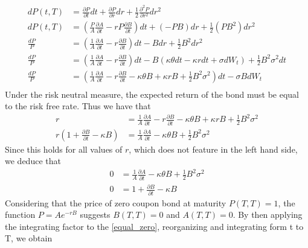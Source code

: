 \begin{align*}
    dP(t,T) &= \frac{\partial P}{\partial t} dt + \frac{\partial P}{\partial r} dr 
    + \frac{1}{2} \frac{\partial^2 P}{\partial r^2} dr^2 \\
    dP(t,T) &= \left( \frac{P}{A} \frac{\partial A}{\partial t} - rP \frac{\partial B}{\partial t} \right) dt 
    + (-PB) dr + \frac{1}{2} (PB^2) dr^2 \\
    \frac{dP}{P} &= \left( \frac{1}{A} \frac{\partial A}{\partial t} - r \frac{\partial B}{\partial t} \right) dt 
    - B dr + \frac{1}{2} B^2 dr^2 \\
    \frac{dP}{P} &= \left( \frac{1}{A} \frac{\partial A}{\partial t} - r \frac{\partial B}{\partial t} \right) dt
     - B(\kappa \theta dt - \kappa r dt + \sigma dW_t) + \frac{1}{2} B^2 \sigma^2 dt\\
    \frac{dP}{P} &= \left( \frac{1}{A} \frac{\partial A}{\partial t} - r \frac{\partial B}{\partial t} 
    - \kappa \theta B + \kappa r B + \frac{1}{2} B^2 \sigma^2 \right) dt - \sigma B dW_t \\
\end{align*}
Under the risk neutral measure, the expected return of the bond must be equal to the risk free rate. Thus we have that
\begin{align*}
    r  &= \frac{1}{A} \frac{\partial A}{\partial t} - r \frac{\partial B}{\partial t} - \kappa \theta B 
    + \kappa r B + \frac{1}{2} B^2 \sigma^2  \\
    r \left( 1 + \frac{\partial B}{\partial t} - \kappa B \right) & =\frac{1}{A} \frac{\partial A}{\partial t} 
    - \kappa \theta B + \frac{1}{2} B^2 \sigma^2 
\end{align*}
Since this holds for all values of $r$, which does not feature in the left hand side, we deduce that
\begin{align}
    0 &= \frac{1}{A} \frac{\partial A}{\partial t} - \kappa \theta B + \frac{1}{2} B^2 \sigma^2 \label{equal_zero2}\\
    0 &=1 + \frac{\partial B}{\partial t} - \kappa B \label{equal_zero}
\end{align}
Considering that the price of zero coupon bond at maturity $P(T,T)=1$, the function $P=A e^{-rB}$ suggests $B(T,T)=0$
and $A(T,T)=0$. By then applying the integrating factor to the \autoref{equal_zero}, reorganizing and integrating
form t to T, we obtain

